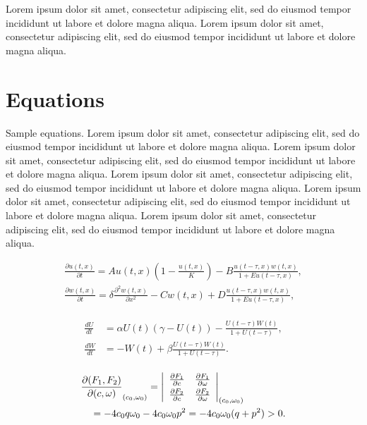 \documentclass[
  journal=large,
  manuscript=propuesta,
  year=2020,
  volume=37,
]{cup-journal}
\begin{document}
Lorem ipsum dolor sit amet, consectetur adipiscing elit, sed do eiusmod tempor incididunt ut labore et dolore magna aliqua. Lorem ipsum dolor sit amet, consectetur adipiscing elit, sed do eiusmod tempor incididunt ut labore et dolore magna aliqua. 

\section{Equations}

Sample equations. Lorem ipsum dolor sit amet, consectetur adipiscing elit, sed do eiusmod tempor incididunt ut labore et dolore magna aliqua. Lorem ipsum dolor sit amet, consectetur adipiscing elit, sed do eiusmod tempor incididunt ut labore et dolore magna aliqua. Lorem ipsum dolor sit amet, consectetur adipiscing elit, sed do eiusmod tempor incididunt ut labore et dolore magna aliqua. Lorem ipsum dolor sit amet, consectetur adipiscing elit, sed do eiusmod tempor incididunt ut labore et dolore magna aliqua. Lorem ipsum dolor sit amet, consectetur adipiscing elit, sed do eiusmod tempor incididunt ut labore et dolore magna aliqua. 


\begin{equation}
\begin{aligned}\label{eq:first}
\frac{\partial u(t,x)}{\partial t} = Au(t,x) \left(1-\frac{u(t,x)}{K}\right)
 -B\frac{u(t-\tau,x) w(t,x)}{1+Eu(t-\tau,x)},\\
\frac{\partial w(t,x)}{\partial t} =\delta \frac{\partial^2w(t,x)}{\partial x^2}-Cw(t,x)
+D\frac{u(t-\tau,x)w(t,x)}{1+Eu(t-\tau,x)},
\end{aligned}
\end{equation}

\begin{align}\label{eq:another}
\begin{split}
\frac{dU}{dt} &=\alpha U(t)(\gamma -U(t))-\frac{U(t-\tau)W(t)}{1+U(t-\tau)},\\
\frac{dW}{dt} &=-W(t)+\beta\frac{U(t-\tau)W(t)}{1+U(t-\tau)}.
\end{split}
\end{align}


\begin{align*}
&\frac{\partial(F_1,F_2)}{\partial(c,\omega)}_{(c_0,\omega_0)} = \left|
\begin{array}{ll}
\frac{\partial F_1}{\partial c} &\frac{\partial F_1}{\partial \omega} \\\noalign{\vskip3pt}
\frac{\partial F_2}{\partial c}&\frac{\partial F_2}{\partial \omega}
\end{array}\right|_{(c_0,\omega_0)}\\
&\quad=-4c_0q\omega_0 -4c_0\omega_0p^2 =-4c_0\omega_0(q+p^2)>0.
\end{align*}
\end{document}
